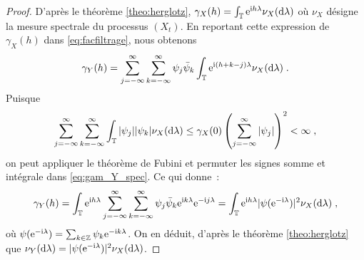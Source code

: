\begin{proof}
D'apr\`es le th\'eor\`eme \ref{theo:herglotz},
$\gamma_X(h)=\int_{\mathbb{T}}
\mathrm{e}^{\mathrm{i} h \lambda}\nu_X(\mathrm{d}\lambda)$ o\`u $\nu_X$ d\'esigne la mesure
spectrale du processus $(X_{t})$.
En reportant cette expression de $\gamma_X(h)$ dans
\eqref{eq:facfiltrage}, nous obtenons
\begin{equation}\label{eq:gam_Y_spec}
 \gamma_Y(h)= \sum_{j=-\infty}^\infty \sum_{k=-\infty}^\infty
          \psi_j \bar{\psi}_k \int_{\mathbb{T}} \mathrm{e}^{\mathrm{i} (h+k-j)\lambda} \nu_X(\mathrm{d}\lambda)\;.
\end{equation}
Puisque
\[
\sum_{j=-\infty}^\infty \sum_{k=-\infty}^\infty
  \int_{\mathbb{T}} |\psi_j| |\psi_k| \nu_X(\mathrm{d}\lambda)
  \leq \gamma_X(0) \left( \sum_{j=-\infty}^\infty |\psi_j| \right)^2<\infty\;,
\]
on peut appliquer le th\'eor\`eme de Fubini et permuter les
signes somme et int\'egrale dans \eqref{eq:gam_Y_spec}. Ce
qui donne~:
\[
\gamma_Y(h)
   = \int_{\mathbb{T}} \mathrm{e}^{\mathrm{i} h \lambda} \sum_{j=-\infty}^\infty \sum_{k=-\infty}^\infty
            \psi_j \bar{\psi}_k \mathrm{e}^{\mathrm{i} k \lambda}\mathrm{e}^{-\mathrm{i} j\lambda}
   = \int_{\mathbb{T}} \mathrm{e}^{\mathrm{i} h \lambda} |\psi(\mathrm{e}^{-\mathrm{i} \lambda})|^2 \nu_X(\mathrm{d}\lambda)\;,
\]
o\`u $\psi(\mathrm{e}^{-\mathrm{i} \lambda})=\sum_{k\in\mathbb{Z}} \psi_k \mathrm{e}^{-\mathrm{i} k \lambda}$.
On en d\'eduit, d'apr\`es le th\'eor\`eme \ref{theo:herglotz}
que $\nu_Y(\mathrm{d}\lambda) = |\psi(\mathrm{e}^{-\mathrm{i} \lambda})|^2\nu_X(\mathrm{d}\lambda)$.

\end{proof}





